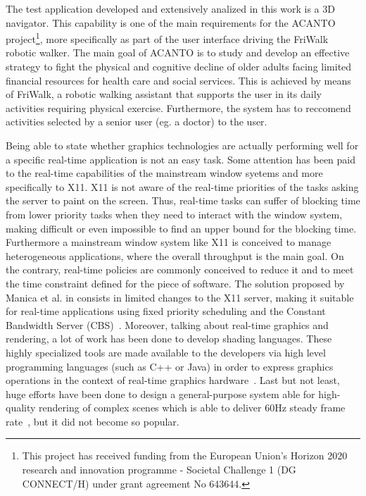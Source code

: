 The test application developed and extensively analized in this work is a 3D navigator.
This capability is one of the main requirements for the ACANTO~\cite{acanto}
project\footnote{This project has received funding from the European Union’s Horizon
2020 research and innovation programme - Societal Challenge 1 (DG CONNECT/H) under 
grant agreement No 643644.}, more specifically as part of the user interface driving
the FriWalk robotic walker.
The main goal of ACANTO is to study and develop an effective strategy to fight the
physical and cognitive decline of older adults facing limited financial
resources for health care and social services. This is achieved by means of FriWalk,
a robotic walking assistant that supports the user in its daily activities requiring
physical exercise. Furthermore, the system has to reccomend activities selected 
by a senior user (eg. a doctor) to the user.

Being able to state whether graphics technologies are actually performing well for
a specific real-time application is not an easy task.
Some attention has been paid to the real-time capabilities of the mainstream window
syetems and more specifically to X11. X11 is not aware of the real-time priorities
of the tasks asking the server to paint on the screen. Thus, real-time
tasks can suffer of blocking time from lower priority tasks when they need to
interact with the window system, making difficult or even impossible to find an
upper bound for the blocking time. Furthermore a mainstream window system like X11
is conceived to manage heterogeneous applications, where the overall throughput
is the main goal. On the contrary, real-time policies are commonly conceived to
reduce it and to meet the time constraint defined for the piece of software.
The solution proposed by Manica et al. in \cite{manica2008qos} consists in limited
changes to the X11 server, making it suitable for real-time applications using
fixed priority scheduling and the Constant Bandwidth Server
(CBS)~\cite{buttazzo2006optimal}. Moreover, talking about real-time graphics and rendering, a lot of work has been
done to develop shading languages. These highly specialized tools
are made available to the developers via high level programming languages
(such as C++ or Java) in order to express graphics operations in the context
of real-time graphics hardware~\cite{Fernando:2003:CTD:862247}. Last but not least,
huge efforts have been done to design a general-purpose system able for high-quality
rendering of complex scenes which is able to deliver 60Hz steady frame
rate~\cite{Montrym:1997:IRG:258734.258871}, but it did not become so popular.

